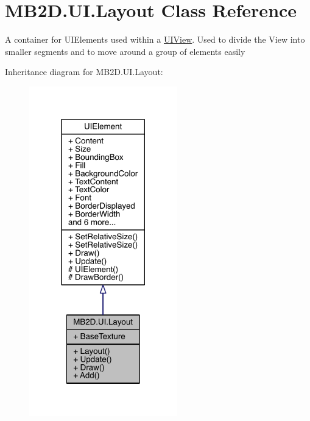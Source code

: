 \hypertarget{class_m_b2_d_1_1_u_i_1_1_layout}{}\section{M\+B2\+D.\+U\+I.\+Layout Class Reference}
\label{class_m_b2_d_1_1_u_i_1_1_layout}


A container for U\+I\+Elements used within a \hyperlink{class_m_b2_d_1_1_u_i_1_1_u_i_view}{U\+I\+View}. Used to divide the View into smaller segments and to move around a group of elements easily  




Inheritance diagram for M\+B2\+D.\+U\+I.\+Layout\+:\nopagebreak
\begin{figure}[H]
\begin{center}
\leavevmode
\includegraphics[width=182pt]{class_m_b2_d_1_1_u_i_1_1_layout__inherit__graph}
\end{center}
\end{figure}


